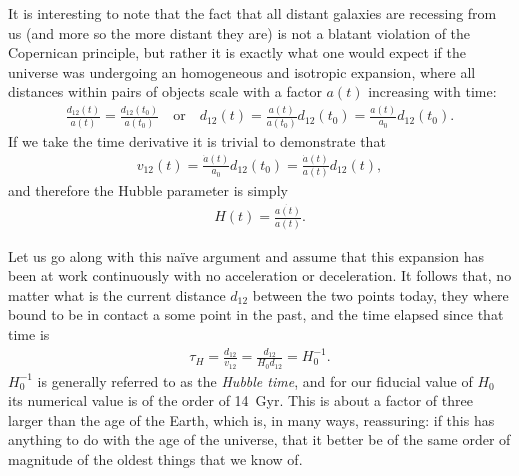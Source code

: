 It is interesting to note that the fact that all distant galaxies are recessing
from us (and more so the more distant they are) is not a blatant violation of the
Copernican principle, but rather it is exactly what one would
expect if the universe was undergoing an homogeneous and isotropic expansion, where
all distances within pairs of objects scale with a factor $a(t)$ increasing with time:
\begin{align*}
  \frac{d_{12}(t)}{a(t)} = \frac{d_{12}(t_0)}{a(t_0)} \quad\text{or}\quad
	d_{12}(t) = \frac{a(t)}{a(t_0)} d_{12}(t_0) = \frac{a(t)}{a_0} d_{12}(t_0).
\end{align*}
If we take the time derivative it is trivial to demonstrate that
\begin{align*}
	v_{12}(t) = \frac{\dot{a}(t)}{a_0} d_{12}(t_0) = \frac{\dot{a}(t)}{a(t)} d_{12}(t),
\end{align*}
and therefore the Hubble parameter is simply
\begin{align}
	H(t) = \frac{\dot{a(t)}}{a(t)}.
\end{align}

Let us go along with this na\"ive argument and assume that this expansion has been
at work continuously with no acceleration or deceleration. It follows that, no matter
what is the current distance $d_{12}$ between the two points today, they where bound
to be in contact a some point in the past, and the time elapsed since that time is
\begin{align*}
	\tau_H = \frac{d_{12}}{v_{12}} = \frac{d_{12}}{H_0 d_{12}} = H_0^{-1}.
\end{align*}
$H_0^{-1}$ is generally referred to as the \emph{Hubble time}, and for our fiducial
value of $H_0$ its numerical value is of the order of 14~Gyr. This is about a factor
of three larger than the age of the Earth, which is, in many ways, reassuring: if
this has anything to do with the age of the universe, that it better be of the same
order of magnitude of the oldest things that we know of.

